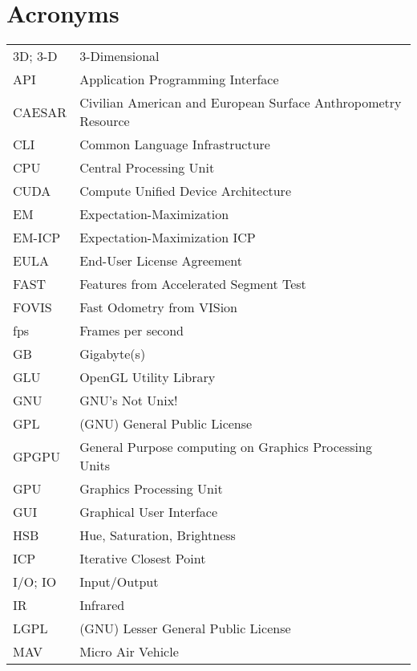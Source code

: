 \cleardoublepage
{}
{}
\chapter*{Acronyms}


\noindent
\begin{longtable}{@{}p{}p{}@{}}
    3D; 3-D & 3-Dimensional \\
        API & Application Programming Interface \\
     CAESAR & Civilian American and European Surface Anthropometry Resource \\
        CLI & Common Language Infrastructure \\
        CPU & Central Processing Unit \\
       CUDA & Compute Unified Device Architecture \\
         EM & Expectation-Maximization \\
     EM-ICP & Expectation-Maximization ICP \\
       EULA & End-User License Agreement \\
       FAST & Features from Accelerated Segment Test \\
      FOVIS & Fast Odometry from VISion \\
        fps & Frames per second \\
         GB & Gigabyte(s) \\
        GLU & OpenGL Utility Library \\
        GNU & GNU's Not Unix! \\
        GPL & (GNU) General Public License \\
      GPGPU & General Purpose computing on Graphics Processing Units \\
        GPU & Graphics Processing Unit \\
        GUI & Graphical User Interface \\
        HSB & Hue, Saturation, Brightness \\
        ICP & Iterative Closest Point \\
    I/O; IO & Input/Output \\
         IR & Infrared \\
       LGPL & (GNU) Lesser General Public License \\
        MAV & Micro Air Vehicle \\

\end{longtable}
